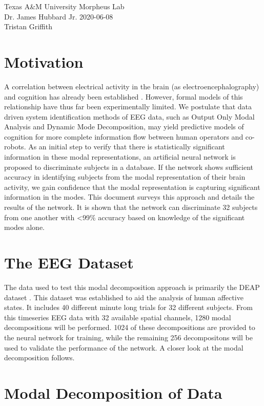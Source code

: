 \documentclass[12pt, a4paper]{article}
\newcommand{\+}[1]{\ensuremath{\mathbf{#1}}} %
\begin{document}
\noindent Texas A\&M University \hfill Morpheus Lab\\
\noindent Dr. James Hubbard Jr. \hfill 2020-06-08\\
\noindent Tristan Griffith

\justify


\section{Motivation}
A correlation between electrical activity in the brain (as electroencephalography) and cognition has already been established \cite{alarcao2017emotions}. However, formal models of this relationship have thus far been experimentally limited. We postulate that data driven system identification methods of EEG data, such as Output Only Modal Analysis and Dynamic Mode Decomposition, may yield predictive models of cognition for more complete information flow between human operators and co-robots. As an initial step to verify that there is statistically significant information in these modal representations, an artificial neural network is proposed to discriminate subjects in a database. If the network shows sufficient accuracy in identifying subjects from the modal representation of their brain activity, we gain confidence that the modal representation is capturing significant information in the modes. This document surveys this approach and details the results of the network. It is shown that the network can discriminate 32 subjects from one another with <99\% accuracy based on knowledge of the significant modes alone.
\section{The EEG Dataset}
The data used to test this modal decomposition approach is primarily the DEAP dataset \cite{koelstra2011deap}. This dataset was established to aid the analysis of human affective states. It includes 40 different minute long  trials for 32 different subjects. From this timeseries EEG data with 32 available spatial channels, 1280 modal decompositions will be performed. 1024 of these decompositions are provided to the neural network for training, while the remaining 256 decompositons will be used to validate the performance of the network. A closer look at the modal decomposition follows.
\section{Modal Decomposition of Data}
\end{document}
